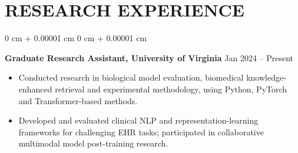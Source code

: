 \documentclass[10pt, letterpaper]{article}
\newenvironment{highlights}{
    \begin{itemize}[
        topsep=0.03 cm,
        parsep=0.03 cm,
        partopsep=0pt,
        itemsep=0pt,
        leftmargin=0 cm + 10pt
    ]
}{
    \end{itemize}
} %
\newenvironment{onecolentry}{
    \begin{adjustwidth}{
        0 cm + 0.00001 cm
    }{
        0 cm + 0.00001 cm
    }
}{
    \end{adjustwidth}
} %
\begin{document}
\section{RESEARCH EXPERIENCE}
\begin{onecolentry}
\textbf{Graduate Research Assistant, University of Virginia} \hfill Jan 2024 -- Present
\begin{highlights}
\item Conducted research in biological model evaluation, biomedical knowledge-enhanced retrieval and experimental methodology, using Python, PyTorch and Transformer-based methods.
\item Developed and evaluated clinical NLP and representation-learning frameworks for challenging EHR tasks; participated in collaborative multimodal model post-training research.
\end{highlights}
\end{onecolentry}
\end{document}
